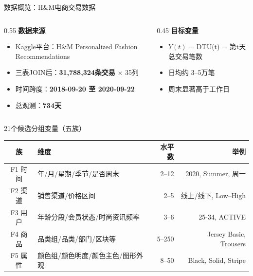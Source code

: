 \documentclass{beamer}
\begin{document}
\begin{frame}{数据概览：H\&M电商交易数据}
    \begin{columns}[T]
        \begin{column}{0.55\textwidth}
            \textbf{数据来源}
            \begin{itemize}
                \item Kaggle平台：H\&M Personalized Fashion Recommendations
                \item 三表JOIN后：\textbf{31,788,324条交易} × 35列
                \item 时间跨度：\textbf{2018-09-20 至 2020-09-22}
                \item 总观测：\textbf{734天}
            \end{itemize}
        \end{column}
        \begin{column}{0.45\textwidth}
            \textbf{目标变量}
            \begin{itemize}
                \item $Y(t)$ = DTU(t) = 第t天总交易笔数
                \item 日均约 3--5万笔
                \item 周末显著高于工作日
            \end{itemize}
        \end{column}
    \end{columns}
    
    \vspace{0.3cm}
    \begin{block}{21个候选分组变量（五族）}
        \begin{tabular}{clrr}
            \toprule
            族 & 维度 & 水平数 & 举例 \\
            \midrule
            F1 时间 & 年/月/星期/季节/是否周末 & 2--12 & 2020, Summer, 周一 \\
            F2 渠道 & 销售渠道/价格区间 & 2--5 & 线上/线下, Low--High \\
            F3 用户 & 年龄分段/会员状态/时尚资讯频率 & 3--6 & 25-34, ACTIVE \\
            F4 商品 & 品类组/品类/部门/区块等 & 5--250 & Jersey Basic, Trousers \\
            F5 属性 & 颜色组/颜色明度/颜色主色/图形外观 & 8--50 & Black, Solid, Stripe \\
            \bottomrule
        \end{tabular}
    \end{block}
\end{frame}
\end{document}
